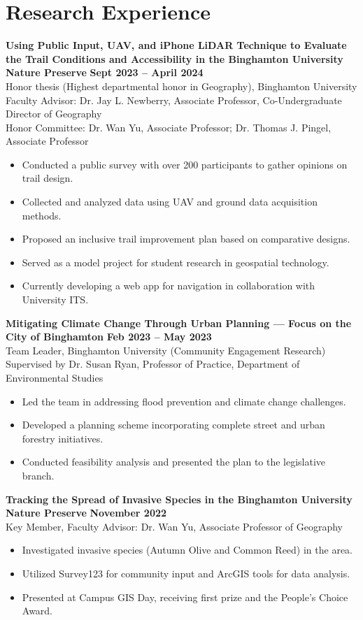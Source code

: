 \documentclass[11pt]{article}
\begin{document}
\section*{Research Experience}
\noindent
\textbf{Using Public Input, UAV, and iPhone LiDAR Technique to Evaluate the Trail Conditions and Accessibility in the Binghamton University Nature Preserve} \hfill \textbf{Sept 2023 -- April 2024} \\
Honor thesis (Highest departmental honor in Geography), Binghamton University \\
Faculty Advisor: Dr. Jay L. Newberry, Associate Professor, Co-Undergraduate Director of Geography \\
Honor Committee: Dr. Wan Yu, Associate Professor; Dr. Thomas J. Pingel, Associate Professor
\begin{itemize}[leftmargin=*]
    \item Conducted a public survey with over 200 participants to gather opinions on trail design.
    \item Collected and analyzed data using UAV and ground data acquisition methods.
    \item Proposed an inclusive trail improvement plan based on comparative designs.
    \item Served as a model project for student research in geospatial technology.
    \item Currently developing a web app for navigation in collaboration with University ITS.
\end{itemize}

\noindent
\textbf{Mitigating Climate Change Through Urban Planning --- Focus on the City of Binghamton} \hfill \textbf{Feb 2023 -- May 2023} \\
Team Leader, Binghamton University (Community Engagement Research) \\
Supervised by Dr. Susan Ryan, Professor of Practice, Department of Environmental Studies
\begin{itemize}[leftmargin=*]
    \item Led the team in addressing flood prevention and climate change challenges.
    \item Developed a planning scheme incorporating complete street and urban forestry initiatives.
    \item Conducted feasibility analysis and presented the plan to the legislative branch.
\end{itemize}

\noindent
\textbf{Tracking the Spread of Invasive Species in the Binghamton University Nature Preserve} \hfill \textbf{November 2022} \\
Key Member, Faculty Advisor: Dr. Wan Yu, Associate Professor of Geography
\begin{itemize}[leftmargin=*]
    \item Investigated invasive species (Autumn Olive and Common Reed) in the area.
    \item Utilized Survey123 for community input and ArcGIS tools for data analysis.
    \item Presented at Campus GIS Day, receiving first prize and the People's Choice Award.
\end{itemize}
\end{document}
